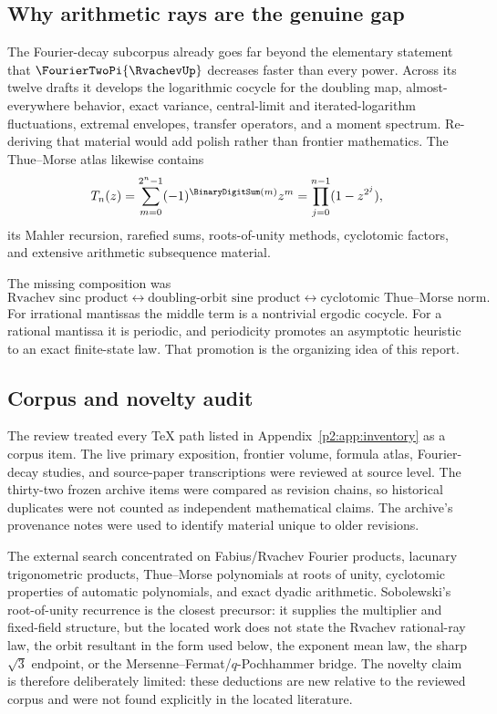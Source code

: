 \documentclass[11pt,oneside]{article}
\theoremstyle{definition}
\theoremstyle{remark}
\begin{document}
\subsection{Why arithmetic rays are the genuine gap}

The Fourier-decay subcorpus already goes far beyond the elementary statement that
$\FourierTwoPi{\RvachevUp}$ decreases faster than every power. Across its twelve drafts it
develops the logarithmic cocycle for the doubling map, almost-everywhere behavior,
exact variance, central-limit and iterated-logarithm fluctuations, extremal
envelopes, transfer operators, and a moment spectrum. Re-deriving that material
would add polish rather than frontier mathematics. The Thue--Morse atlas likewise
contains
\[
 T_n(z)=\sum_{m=0}^{2^n-1}(-1)^{\BinaryDigitSum(m)}z^m
       =\prod_{j=0}^{n-1}(1-z^{2^j}),
\]
its Mahler recursion, rarefied sums, roots-of-unity methods, cyclotomic factors,
and extensive arithmetic subsequence material.

The missing composition was
\[
 \text{Rvachev sinc product}
 \longleftrightarrow
 \text{doubling-orbit sine product}
 \longleftrightarrow
 \text{cyclotomic Thue--Morse norm}.
\]
For irrational mantissas the middle term is a nontrivial ergodic cocycle. For a
rational mantissa it is periodic, and periodicity promotes an asymptotic heuristic
to an exact finite-state law. That promotion is the organizing idea of this report.

\subsection{Corpus and novelty audit}

The review treated every TeX path listed in Appendix~\ref{p2:app:inventory} as a corpus
item. The live primary exposition, frontier volume, formula atlas, Fourier-decay
studies, and source-paper transcriptions were reviewed at source level. The
thirty-two frozen archive items were compared as revision chains, so historical
duplicates were not counted as independent mathematical claims. The archive's
provenance notes were used to identify material unique to older revisions.

The external search concentrated on Fabius/Rvachev Fourier products, lacunary
trigonometric products, Thue--Morse polynomials at roots of unity, cyclotomic
properties of automatic polynomials, and exact dyadic arithmetic. Sobolewski's
root-of-unity recurrence is the closest precursor: it supplies the multiplier and
fixed-field structure, but the located work does not state the Rvachev rational-ray
law, the orbit resultant in the form used below, the exponent mean law, the sharp
$\sqrt3$ endpoint, or the Mersenne--Fermat/$q$-Pochhammer bridge. The novelty claim
is therefore deliberately limited: these deductions are new relative to the
reviewed corpus and were not found explicitly in the located literature.
\end{document}
